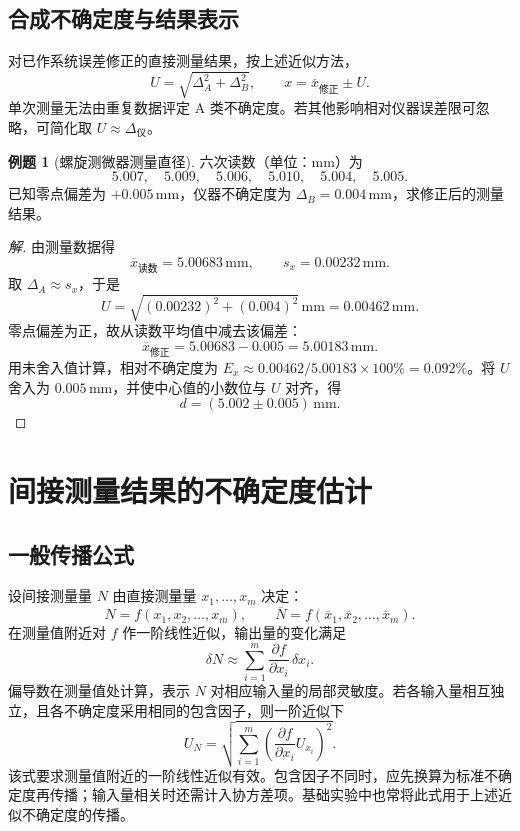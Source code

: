 \documentclass[UTF8, fontset=fandol, a4paper, 12pt]{ctexart}
\theoremstyle{definition}
\newtheorem{example}{例题}[section]
\newcommand{\meanx}{\overline{x}}
\newcommand{\meanN}{\overline{N}}
\begin{document}
\subsection*{合成不确定度与结果表示}

对已作系统误差修正的直接测量结果，按上述近似方法，
\[
  U=\sqrt{\Delta_A^2+\Delta_B^2},\qquad
  x=\meanx_{\mathrm{修正}}\pm U.
\]
单次测量无法由重复数据评定 A 类不确定度。若其他影响相对仪器误差限可忽略，可简化取 $U\approx\Delta_{\text{仪}}$。

\begin{example}[螺旋测微器测量直径]
六次读数（单位：$\mathrm{mm}$）为
\[
  5.007,\quad5.009,\quad5.006,\quad5.010,\quad5.004,\quad5.005.
\]
已知零点偏差为 $+0.005\,\mathrm{mm}$，仪器不确定度为 $\Delta_B=0.004\,\mathrm{mm}$，求修正后的测量结果。
\end{example}

\begin{proof}[解]
由测量数据得
\[
  \meanx_{\mathrm{读数}}=5.00683\,\mathrm{mm},\qquad
  s_x=0.00232\,\mathrm{mm}.
\]
取 $\Delta_A\approx s_x$，于是
\[
  U=\sqrt{(0.00232)^2+(0.004)^2}\,\mathrm{mm}
   =0.00462\,\mathrm{mm}.
\]
零点偏差为正，故从读数平均值中减去该偏差：
\[
  \meanx_{\mathrm{修正}}=5.00683-0.005=5.00183\,\mathrm{mm}.
\]
用未舍入值计算，相对不确定度为 $E_x\approx0.00462/5.00183\times100\%=0.092\%$。将 $U$ 舍入为 $0.005\,\mathrm{mm}$，并使中心值的小数位与 $U$ 对齐，得
\[
  \boxed{d=(5.002\pm0.005)\,\mathrm{mm}}.
\]
\end{proof}

\section{间接测量结果的不确定度估计}

\subsection*{一般传播公式}

设间接测量量 $N$ 由直接测量量 $x_1,\ldots,x_m$ 决定：
\[
  N=f(x_1,x_2,\ldots,x_m),\qquad
  \meanN=f(\meanx_1,\meanx_2,\ldots,\meanx_m).
\]
在测量值附近对 $f$ 作一阶线性近似，输出量的变化满足
\[
  \delta N\approx\sum_{i=1}^m
  \frac{\partial f}{\partial x_i}\,\delta x_i.
\]
偏导数在测量值处计算，表示 $N$ 对相应输入量的局部灵敏度。若各输入量相互独立，且各不确定度采用相同的包含因子，则一阶近似下
\[
  U_N=\sqrt{\sum_{i=1}^m
    \left(\frac{\partial f}{\partial x_i}U_{x_i}\right)^2}.
\]
该式要求测量值附近的一阶线性近似有效。包含因子不同时，应先换算为标准不确定度再传播；输入量相关时还需计入协方差项。基础实验中也常将此式用于上述近似不确定度的传播。
\end{document}
